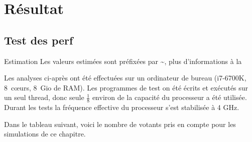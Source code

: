 \documentclass[../report]{subfiles}
\begin{document}
\part{Résultat}

\chapter{Test des perf}


\begin{nota}{Estimation}
	Les valeurs estimées sont préfixées par \textasciitilde{}, plus d'informations à la 
\end{nota}

Les analyses ci-après ont été effectuées sur un ordinateur de bureau (i7-6700K, 8~cœurs, 8~Gio de RAM).
Les programmes de test on été écrits et exécutés sur un seul thread, donc seule $\frac{1}{8}$ environ de 
la capacité du processeur a été utilisée.
Durant les tests la fréquence effective du processeur s'est stabilisée à 4 GHz.

Dans le tableau suivant, voici le nombre de votants pris en compte pour les simulations de ce chapitre.
\end{document}

